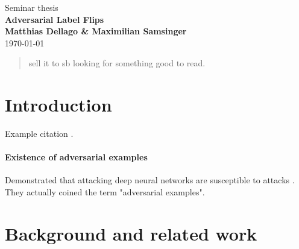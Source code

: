 \documentclass{article}
\begin{document}
\begin{titlepage}
	\noindent{}
	\vspace{3cm}
	\begin{center}
		{\Large Seminar thesis}
		\vspace{50pt}\\
		\textbf{\Huge Adversarial Label Flips}
		\vspace{40pt}\\
		\textbf{\Large Matthias Dellago \& Maximilian Samsinger}\vspace{20pt}\\
		{\large\today}
		\vspace{120pt}
	\end{center}
\end{titlepage}
	
	\DeclarePairedDelimiter\abs{\lvert}{\rvert}%
	\DeclarePairedDelimiter\norm{\lVert}{\rVert}%
	\DeclarePairedDelimiter\ceil{\lceil}{\rceil}
	\DeclarePairedDelimiter\floor{\lfloor}{\rfloor}
	
\begin{abstract}
	sell it to sb looking for something good to read.
\end{abstract}

\section{Introduction}
Example citation \cite{madry2017towards}.

\paragraph{Existence of adversarial examples}
Demonstrated that attacking deep neural networks are susceptible to attacks \cite{Szegedy13}. They actually coined the term "adversarial examples".

\section{Background and related work}
\end{document}
